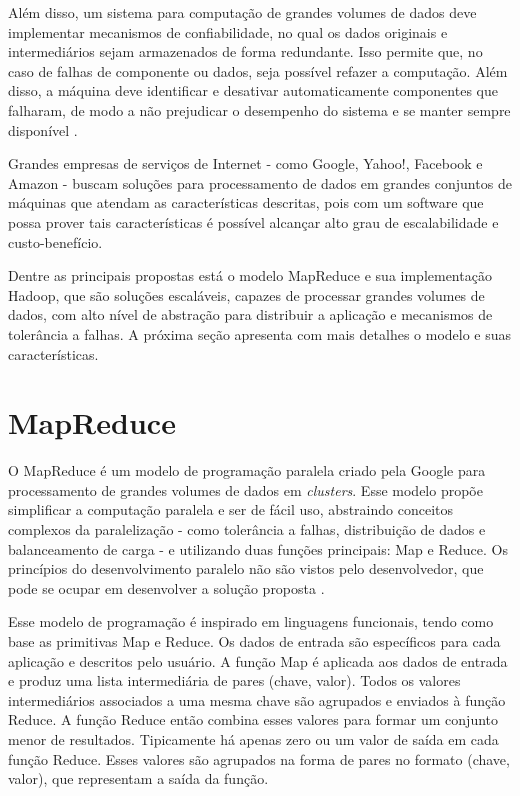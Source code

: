 
Além disso, um sistema para computação de grandes volumes de dados deve implementar mecanismos de confiabilidade, no qual os dados originais e intermediários sejam armazenados de forma redundante. Isso permite que, no caso de falhas de componente ou dados, seja possível refazer a computação. Além disso, a máquina deve identificar e desativar automaticamente componentes que falharam, de modo a não prejudicar o desempenho do sistema e se manter sempre disponível \cite{Bryant:2011}.

Grandes empresas de serviços de Internet - como Google, Yahoo!, Facebook e Amazon - buscam soluções para processamento de dados em grandes conjuntos de máquinas que atendam as características descritas, pois com um software que possa prover tais características é possível alcançar alto grau de escalabilidade e custo-benefício. 

Dentre as principais propostas está o modelo MapReduce e sua implementação Hadoop, que são soluções escaláveis, capazes de processar grandes volumes de dados, com alto nível de abstração para distribuir a aplicação e mecanismos de tolerância a falhas.
A próxima seção apresenta com mais detalhes o modelo e suas características.

\section{MapReduce}
O MapReduce é um modelo de programação paralela criado pela Google para processamento de grandes volumes de dados em \textit{clusters}. Esse modelo propõe simplificar a computação paralela e ser de fácil uso, abstraindo conceitos complexos da paralelização - como tolerância a falhas, distribuição de dados e balanceamento de carga - e utilizando duas funções principais: Map e Reduce. Os princípios do desenvolvimento paralelo não são vistos pelo desenvolvedor, que pode se ocupar em desenvolver a solução proposta \cite{Dean:2008}.

Esse modelo de programação é inspirado em linguagens funcionais, tendo como base as primitivas Map e Reduce.
Os dados de entrada são específicos para cada aplicação e descritos pelo usuário.
A função Map é aplicada aos dados de entrada e produz uma lista intermediária de pares (chave, valor). Todos os valores intermediários associados a uma mesma chave são agrupados e enviados à função Reduce.
A função Reduce então
combina esses valores para formar um conjunto menor de resultados.
Tipicamente há apenas zero ou um valor de saída em cada função Reduce. Esses valores são agrupados na forma de pares no formato (chave, valor), que representam a saída da função.

